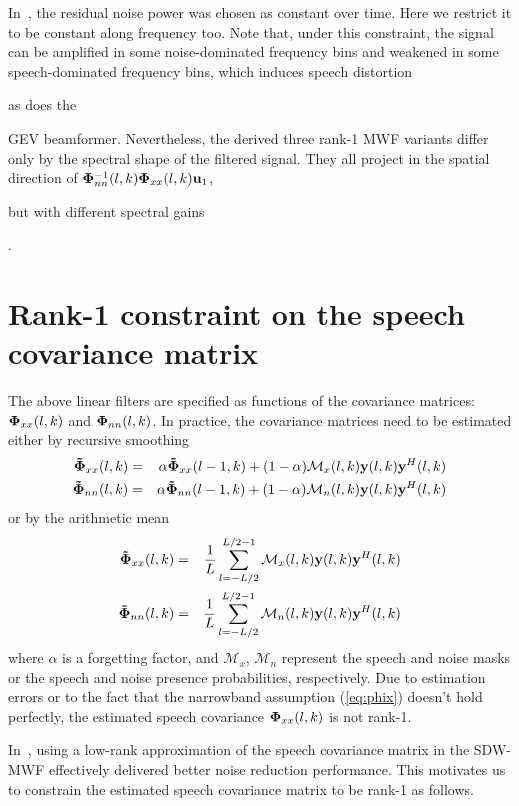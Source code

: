 \documentclass[review]{elsarticle}
\newif\ifproofread
\newcommand{\pfmarker}[1]{%
\ifproofread
\textcolor{red}{#1}%
\else
#1%
\fi
}
\newif\ifminorR
\newcommand{\pfminor}[1]{%
\ifminorR
\textcolor{red}{#1}%
\else
#1%
\fi
}
\begin{document}
In~\cite{2015residual}, the residual noise power was chosen as constant over time. Here we restrict it to be constant along frequency too. Note that, under this constraint, the signal can be amplified in some noise-dominated frequency bins and weakened in some speech-dominated frequency bins, which induces speech distortion \pfminor{as does the} GEV beamformer. Nevertheless, the derived three rank-1 MWF variants differ only by the spectral shape of the filtered signal. They all project in the spatial direction of ${\bf \Phi}_{nn}^{-1}(l,k){\bf \Phi}_{xx}(l,k){\bf u}_{1}$, \pfmarker{but with different spectral gains}.


\pfmarker{\section{Rank-1 constraint on the speech covariance matrix}}

The above linear filters are specified as functions of the covariance matrices: ${\bf \Phi}_{xx}(l,k)$ and ${\bf \Phi}_{nn}(l,k)$. In practice, the covariance matrices need to be estimated either by recursive smoothing
\begin{eqnarray}\label{eq:recsmoo}
  {\bf \tilde\Phi}_{xx}(l,k) &=& \alpha{\bf \tilde\Phi}_{xx}(l-1,k) + (1-\alpha)\pfmarker{\mathcal{M}_{x}(l,k){\bf y}(l,k){\bf y}^H(l,k)} \\
  {\bf \tilde\Phi}_{nn}(l,k) &=& \alpha{\bf \tilde\Phi}_{nn}(l-1,k) + (1-\alpha)\pfmarker{\mathcal{M}_{n}(l,k){\bf y}(l,k){\bf y}^H(l,k)}
\end{eqnarray}
or by the arithmetic mean
\begin{eqnarray}\label{eq:armean}
  {\bf \tilde\Phi}_{xx}(l,k) &=& \frac{1}{L}\sum_{l=-L/2}^{L/2-1}\pfmarker{\mathcal{M}_{x}(l,k){\bf y}(l,k){\bf y}^H(l,k)} \\
  {\bf \tilde\Phi}_{nn}(l,k) &=& \frac{1}{L}\sum_{l=-L/2}^{L/2-1}\pfmarker{\mathcal{M}_{n}(l,k){\bf y}(l,k){\bf y}^H(l,k)}
\end{eqnarray}
where $\alpha$ is a forgetting factor, and $\mathcal{M}_{x}$, $\mathcal{M}_{n}$ represent the speech and noise masks or the speech and noise presence probabilities, respectively. Due to estimation errors or to the fact that the narrowband assumption (\ref{eq:phix}) doesn't hold perfectly, the estimated speech covariance ${\bf \Phi}_{xx}(l,k)$ is not rank-1. \pfmarker{In~\cite{2014serizellow}, using a low-rank approximation of the speech covariance matrix in the SDW-MWF effectively delivered better noise reduction performance. This motivates us to constrain the estimated speech covariance matrix to be rank-1 as follows.}
\end{document}
